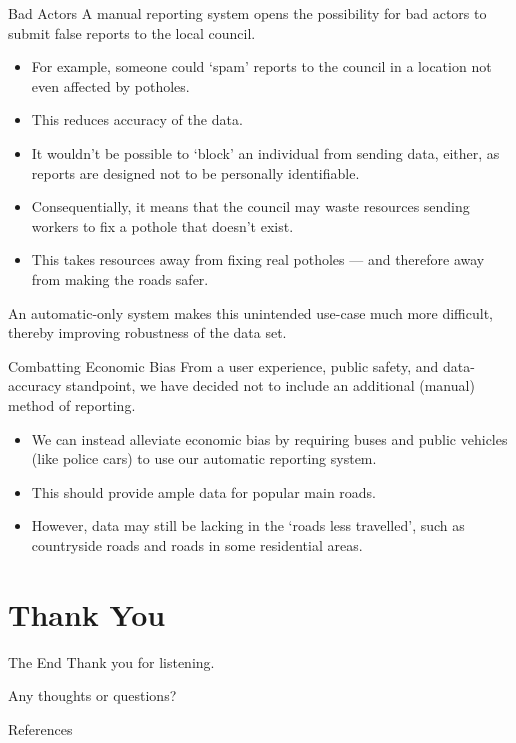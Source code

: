 \documentclass{beamer}
\begin{document}
\begin{frame}{Bad Actors}
    A manual reporting system opens the possibility for bad actors to submit false reports to the local council.

    \begin{itemize}
        \item For example, someone could `spam' reports to the council in a location not even affected by potholes.
        \item This reduces accuracy of the data.
        \item It wouldn't be possible to `block' an individual from sending data, either, as reports are designed not to be personally identifiable.
        \item Consequentially, it means that the council may waste resources sending workers to fix a pothole that doesn't exist.
        \item This takes resources away from fixing real potholes --- and therefore away from making the roads safer.
    \end{itemize}

    An automatic-only system makes this unintended use-case much more difficult, thereby improving robustness of the data set.
\end{frame}

\begin{frame}{Combatting Economic Bias}
    From a user experience, public safety, and data-accuracy standpoint, we have decided \alert{not} to include an additional (manual) method of reporting.

    \begin{itemize}
        \item We can instead alleviate economic bias by requiring buses and public vehicles (like police cars) to use our automatic reporting system.
        \item This should provide ample data for popular main roads.
        \item However, data may still be lacking in the `roads less travelled', such as countryside roads and roads in some residential areas.
    \end{itemize}
\end{frame}

\section{Thank You}

\begin{frame}{The End}
    Thank you for listening.
    
    Any thoughts or questions?
\end{frame}

\begin{frame}[allowframebreaks]{References}
    \printbibliography
\end{frame}
\end{document}
